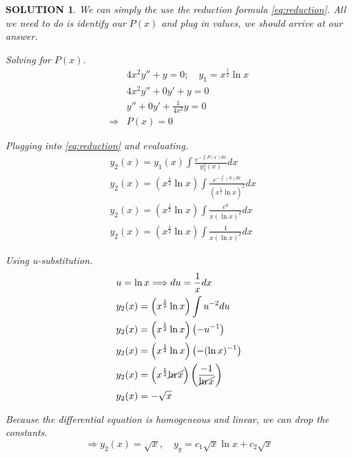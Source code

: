 \documentclass{article}
\theoremstyle{solution}
\newtheorem*{solution}{SOLUTION}
\theoremstyle{definition}
\begin{document}
\begin{solution}
    We can simply the use the reduction formula \eqref{eq:reduction}. All we need to do is identify
    our $P(x)$ and plug in values, we should arrive at our answer.

    Solving for $P(x)$.
    \begin{align*}
                        & 4x^{2}y''+y=0; \quad y_1 = x^{\frac{1}{2}} \ln x \\ 
                        & 4x^{2}y''+ 0y' + y=0\\
                        & y'' + 0y' + \frac{1}{4x^{2}} y = 0 \\
        \Longrightarrow & P(x) = 0
    \end{align*}

    Plugging into \eqref{eq:reduction} and evaluating.
    \begin{align*}
        & y_2(x) = y_1(x) \int \frac{e^{-\int P(x) dx}}{y_{1}^{2}(x)} dx \\
        & y_2(x) = \left(x^{\frac{1}{2}} \ln x\right) \int \frac{e^{-\int \left(0\right) dx}}{\left(x^{\frac{1}{2}} \ln x\right)^2} dx \\
        & y_2(x) = \left(x^{\frac{1}{2}} \ln x\right) \int \frac{e^{0}}{x (\ln x)^2} dx \\
        & y_2(x) = \left(x^{\frac{1}{2}} \ln x\right) \int \frac{1}{x (\ln x)^2} dx
    \end{align*}
    
    Using u-substitution.
    \begin{align*}
        & u = \ln x \Longrightarrow du = \frac{1}{x} dx \\
        & y_2(x) = \left(x^{\frac{1}{2}} \ln x\right) \int u^{-2} du \\
        & y_2(x) = \left(x^{\frac{1}{2}} \ln x\right) \left(-u^{-1}\right) \\
        & y_2(x) = \left(x^{\frac{1}{2}} \ln x\right) \left(-(\ln x)^{-1}\right) \\
        & y_2(x) = \left(x^{\frac{1}{2}} \cancel{\ln x}\right) \left( \frac{-1}{\cancel{\ln x}}\right) \\
        & y_2(x) = -\sqrt{x}
    \end{align*}

    Because the differential equation is homogeneous and linear, we can drop the constants.
    \begin{equation*}
       \Longrightarrow \boxed{y_2(x) = \sqrt{x}, \quad  y_g = c_1 \sqrt{x} \ln x + c_2 \sqrt{x}}
    \end{equation*}
    
\end{solution}
\end{document}
